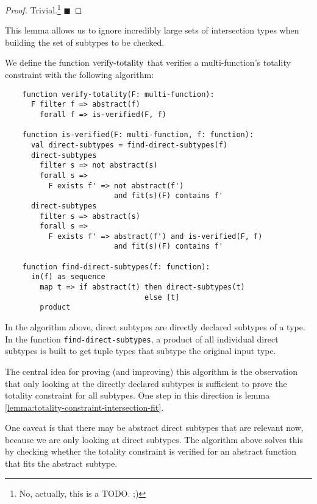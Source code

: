 \begin{proof}
	Trivial.\footnote{No, actually, this is a TODO. ;)} $\blacksquare$
\end{proof}

\noindent This lemma allows us to ignore incredibly large sets of intersection types when building the set of subtypes to be checked.

\begin{definition} \label{def:totality-constraint-verification-algorithm}
	We define the function $\operatorname{verify-totality}$ that verifies a multi-function's totality constraint with the following algorithm:
	
	\begin{lstlisting}
    function verify-totality(F: multi-function):
      F filter f => abstract(f)
        forall f => is-verified(F, f)
      
    function is-verified(F: multi-function, f: function):
      val direct-subtypes = find-direct-subtypes(f)
      direct-subtypes
        filter s => not abstract(s)
        forall s => 
          F exists f' => not abstract(f') 
                         and fit(s)(F) contains f'
      direct-subtypes
        filter s => abstract(s)
        forall s =>
          F exists f' => abstract(f') and is-verified(F, f)
                         and fit(s)(F) contains f'
    
    function find-direct-subtypes(f: function):
      in(f) as sequence
        map t => if abstract(t) then direct-subtypes(t) 
                                else [t]
        product  
	\end{lstlisting}
\end{definition}

\noindent In the algorithm above, direct subtypes are directly declared subtypes of a type. In the function \texttt{find-direct-subtypes}, a product of all individual direct subtypes is built to get tuple types that subtype the original input type.

The central idea for proving (and improving) this algorithm is the observation that only looking at the directly declared subtypes is sufficient to prove the totality constraint for all subtypes. One step in this direction is lemma \ref{lemma:totality-constraint-intersection-fit}.

One caveat is that there may be abstract direct subtypes that are relevant now, because we are only looking at direct subtypes. The algorithm above solves this by checking whether the totality constraint is verified for an abstract function that fits the abstract subtype.



